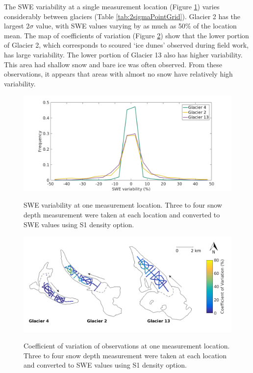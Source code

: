 \documentclass{sfuthesis}
\begin{document}
The SWE variability at a single measurement location (Figure \ref{fig:SWEvar_oneloc_hist}) varies considerably between glaciers (Table \ref{tab:2sigmaPointGrid}). Glacier 2 has the largest $2\sigma$ value, with SWE values varying by as much as 50\% of the location mean. The map of coefficients of variation (Figure \ref{fig:SWEvar_oneloc_map}) show that the lower portion of Glacier 2, which corresponds to scoured `ice dunes' observed during field work, has large variability. The lower portion of Glacier 13 also has higher variability. This area had shallow snow and bare ice was often observed. From these observations, it appears that areas with almost no snow have relatively high variability.

\begin{figure}[H]
	\centering
	\includegraphics[width =\textwidth]{SWEvarOneLocHIST.png}\\
	\caption{SWE variability at one measurement location. Three to four snow depth measurement were taken at each location and converted to SWE values using S1 density option.}
	\label{fig:SWEvar_oneloc_hist}
\end{figure}

\begin{figure}[H]
	\centering
	\includegraphics[width =\textwidth]{Map_pointstd.png}\\
	\caption{Coefficient of variation of observations at one measurement location. Three to four snow depth measurement were taken at each location and converted to SWE values using S1 density option.}
	\label{fig:SWEvar_oneloc_map}
\end{figure}
\end{document}
